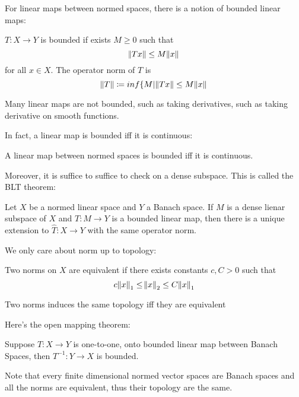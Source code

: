 \documentclass[main.tex]{subfiles}
\begin{document}
For linear maps between normed spaces, there is a notion of bounded linear maps:

\begin{definition}
$T: X \rightarrow Y$ is bounded if exists $M \geq 0$ such that 
$$
\norm{Tx} \leq M \norm{x}
$$
for all $x \in X$. The operator norm of $T$ is 
$$
\norm{T} \coloneqq inf \{ M | \norm{Tx} \leq M \norm{x}
$$
\end{definition}


Many linear maps are not bounded, such as taking derivatives, such as taking derivative on smooth functions. 

In fact, a linear map is bounded iff it is continuous:

\begin{theorem}
A linear map between normed spaces is bounded iff it is continuous.
\end{theorem}

Moreover, it is suffice to suffice to check on a dense subspace. This is called the BLT theorem:

\begin{theorem}
Let $X$ be a normed linear space and $Y$ a Banach space. If $M$ is a dense lienar subspace of $X$ and $T: M \rightarrow Y$ is a bounded linear map, then there is a unique extension to $\hat{T}: X \rightarrow Y$ with the same operator norm.
\end{theorem}

We only care about norm up to topology:

\begin{definition}
Two norms on $X$ are equivalent if there exists constants $c , C > 0$ such that 
$$
c\norm{x}_1 \leq \norm{x}_2 \leq C\norm{x}_1
$$
\end{definition}

\begin{theorem}
Two norms induces the same topology iff they are equivalent
\end{theorem}

Here's the open mapping theorem:

\begin{theorem}
Suppose $T: X \rightarrow Y$ is one-to-one, onto bounded linear map between Banach Spaces, then $T^{-1} : Y \rightarrow X$ is bounded.
\end{theorem}


Note that every finite dimensional normed vector spaces are Banach spaces and all the norms are equivalent, thus their topology are the same.
\end{document}
